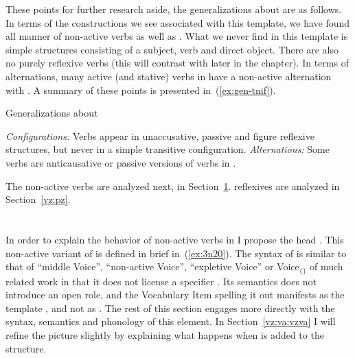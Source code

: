 \begin{exe}
\begin{xlist}
\begin{xlist}
\begin{exe}
\begin{xlist}
\begin{xlist}
\begin{exe}
\begin{xlist}
\begin{xlist}
\begin{exe}
\begin{exe}
\begin{xlist}
\begin{exe}
\begin{exe}
\begin{xlist}
\begin{exe}
\begin{exe}
\begin{exe}
\begin{exe}
\begin{exe}
\begin{xlist}
\begin{exe}
\begin{xlist}
\begin{exe}
\begin{exe}
\begin{xlist}
These points for further research aside, the generalizations about {\tnif} are as follows. In terms of the constructions we see associated with this template, we have found all manner of non-active verbs as well as . What we never find in this template is simple  structures consisting of a subject, verb and direct object. There are also no purely reflexive verbs (this will contrast with {\thit} later in the chapter). In terms of alternations, many active (and stative) verbs in {\tkal} have a non-active alternation with {\tnif}. A summary of these points is presented in~(\ref{ex:gen-tnif}).

 \begin{exe}
 \ex  \label{ex:gen-tnif}Generalizations about {\tnif} 
 \begin{xlist} 
 	\ex  \textit{Configurations:} Verbs appear in unaccusative, passive and figure reflexive structures, but never in a simple transitive configuration. 
 	\ex  \textit{Alternations:} Some verbs are anticausative or passive versions of verbs in {\tkal}. 
 \z
\z 

The non-active verbs are analyzed next, in Section~\ref{vz:vz}.  reflexives are analyzed in Section~\ref{vz:pz}.


\section{\vz} \label{vz:vz}
In order to explain the behavior of non-active verbs in {\tnif} I propose the head {\vz}. This non-active variant of  is defined in brief in~(\ref{ex:3n20}). The syntax of {\vz} is similar to that of ``middle Voice'', ``non-active Voice'', ``expletive Voice'' or Voice$_{\{\}}$ of much related work in that it does not license a specifier \citep{lidz01,schaefer08,alexiadoudoron12,layering15,bruening13,wood15springer,myler16mit,kastnerzu17}. Its semantics does not introduce an open  role, and the Vocabulary Item spelling it out manifests as the template {\tnif}, and not as {\tkal}. The rest of this section engages more directly with the syntax, semantics and phonology of this element. In Section~\ref{vz:va:vzva} I will refine the picture slightly by explaining what happens when {\va} is added to the structure.


\end{xlist}
\end{exe}
\end{xlist}
\end{exe}
\end{exe}
\end{xlist}
\end{exe}
\end{xlist}
\end{exe}
\end{exe}
\end{exe}
\end{exe}
\end{exe}
\end{xlist}
\end{exe}
\end{exe}
\end{xlist}
\end{exe}
\end{exe}
\end{xlist}
\end{xlist}
\end{exe}
\end{xlist}
\end{xlist}
\end{exe}
\end{xlist}
\end{xlist}
\end{exe}
